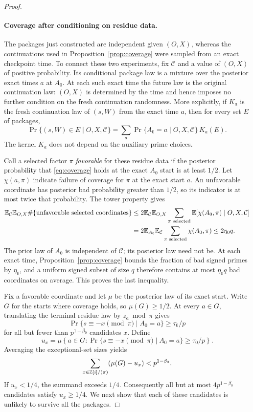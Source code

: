 \begin{proof}
\paragraph{Coverage after conditioning on residue data.}
The packages just constructed are independent given \((O,X)\),
whereas the continuations used in Proposition~\ref{prop:coverage}
were sampled from an exact checkpoint time. To connect these two
experiments, fix \(\mathcal C\) and a value of \((O,X)\) of
positive probability. Its conditional package law is a mixture over
the posterior exact times \(a\) at \(A_0\). At each such exact
time the future law is the original continuation law: \((O,X)\)
is determined by the time and hence imposes no further condition on
the fresh continuation randomness.
More explicitly, if $K_a$ is the fresh continuation law of $(s,W)$
from the exact time $a$, then for every set $E$ of packages,
\begin{equation}\label{eq:posterior-kernel}
 \Pr\{(s,W)\in E\mid O,X,\mathcal C\}
 =\sum_a\Pr\{A_0=a\mid O,X,\mathcal C\}\,K_a(E).
\end{equation}
The kernel $K_a$ does not depend on the auxiliary prime choices.

Call a selected factor \(\pi\) \emph{favorable} for these residue
data if the posterior probability that \eqref{eq:coverage} holds at
the exact \(A_0\) start is at least \(1/2\). Let \(\chi(a,\pi)\)
indicate failure of coverage for \(\pi\) at the exact start \(a\).
An unfavorable coordinate has posterior bad probability greater than
\(1/2\), so its indicator is at most twice that probability. The
tower property gives
\begin{align}
 \mathbb E_{\mathcal C}\mathbb E_{O,X}
 \#\{\text{unfavorable selected coordinates}\}
 &\le 2\mathbb E_{\mathcal C}\mathbb E_{O,X}
       \sum_{\pi\text{ selected}}
       \mathbb E[\chi(A_0,\pi)\mid O,X,\mathcal C] \notag\\
 &=2\mathbb E_{A_0}\mathbb E_{\mathcal C}
       \sum_{\pi\text{ selected}}\chi(A_0,\pi)
 \le 2\eta_0q.
 \label{eq:unfavorable-fraction}
\end{align}
The prior law of \(A_0\) is independent of \(\mathcal C\); its
posterior law need not be. At each exact time,
Proposition~\ref{prop:coverage} bounds the fraction of bad signed
primes by \(\eta_0\), and a uniform signed subset of size \(q\)
therefore contains at most \(\eta_0q\) bad coordinates on average.
This proves the last inequality.

Fix a favorable coordinate and let \(\mu\) be the posterior law
of its exact start. Write \(G\) for the starts where coverage
holds, so \(\mu(G)\ge1/2\). At every \(a\in G\), translating
the terminal residue law by \(z_a\bmod\pi\) gives
\[
 \Pr\{s\equiv-x\pmod\pi\mid A_0=a\}\ge\tau_0/p
\]
for all but fewer than \(p^{1-\beta_0}\) candidates \(x\). Define
\[
 u_x=\mu\left\{a\in G:
     \Pr\{s\equiv-x\pmod\pi\mid A_0=a\}\ge\tau_0/p\right\}.
\]
Averaging the exceptional-set sizes yields
\[
 \sum_{x\in\mathbb Z[i]/(\pi)}(\mu(G)-u_x)<p^{1-\beta_0}.
\]
If \(u_x<1/4\), the summand exceeds \(1/4\). Consequently all
but at most \(4p^{1-\beta_0}\) candidates satisfy \(u_x\ge1/4\).
We next show that each of these candidates is unlikely to survive
all the packages.


\end{proof}
